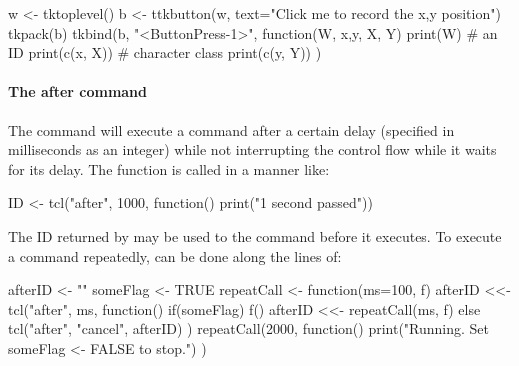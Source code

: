 \begin{Schunk}
\begin{Sinput}
 w <- tktoplevel()
 b <- ttkbutton(w, text="Click me to record the x,y position")
 tkpack(b)
 tkbind(b, "<ButtonPress-1>", function(W, x,y, X, Y) {
   print(W)                              # an ID
   print(c(x, X))                        # character class
   print(c(y, Y))
   })
\end{Sinput}
\end{Schunk}




\paragraph{The after command}
The \TCL\/ command  will execute a command after a certain
delay (specified in milliseconds as an integer) while not interrupting
the control flow while it waits for its delay. The function is called
in a manner like:
\begin{Schunk}
  \begin{Sinput}
    ID <- tcl("after", 1000, function() print("1 second passed"))    
  \end{Sinput}
\end{Schunk}
The ID returned by  may be used to  the
command before it executes. To execute a command repeatedly, can be
done along the lines of:
\begin{Schunk}
\begin{Sinput}
 afterID <- ""
 someFlag <- TRUE
 repeatCall <- function(ms=100, f) {
   afterID <<- tcl("after", ms, function() {
     if(someFlag) {                      
       f()
       afterID <<- repeatCall(ms, f)
     }  else {
       tcl("after", "cancel", afterID)
     }
   })
 }
 repeatCall(2000, function() {
   print("Running. Set someFlag <- FALSE to stop.")
 })
\end{Sinput}
\end{Schunk}
%


